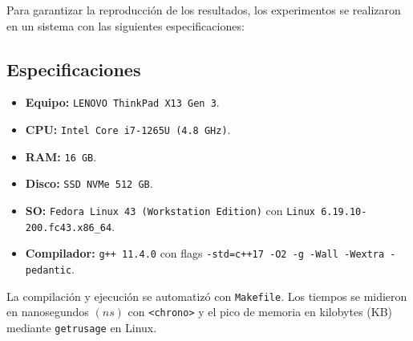 Para garantizar la reproducción de los resultados, los experimentos se realizaron en un sistema con las siguientes especificaciones:

\subsection*{Especificaciones}
\begin{itemize}
  \item \textbf{Equipo:} \texttt{LENOVO ThinkPad X13 Gen 3}.
  \item \textbf{CPU:} \texttt{Intel Core i7-1265U (4.8 GHz)}.
  \item \textbf{RAM:} \texttt{16 GB}.
  \item \textbf{Disco:} \texttt{SSD NVMe 512 GB}.
  \item \textbf{SO:} \texttt{Fedora Linux 43 (Workstation Edition)} con \texttt{Linux 6.19.10-200.fc43.x86\_64}.
  \item \textbf{Compilador:} \texttt{g++ 11.4.0} con flags \texttt{-std=c++17 -O2 -g -Wall -Wextra -pedantic}.
\end{itemize}

La compilación y ejecución se automatizó con \texttt{Makefile}. Los tiempos se midieron en nanosegundos $(ns)$ con \texttt{<chrono>} \parencite{cppreference_chrono} y el pico de memoria en kilobytes (KB) mediante \texttt{getrusage} en Linux. \parencite{linux_getrusage}


